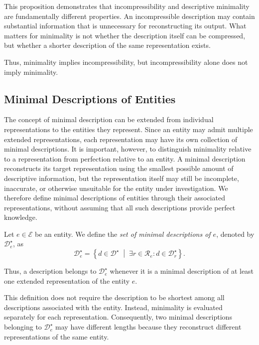 This proposition demonstrates that incompressibility and descriptive minimality are fundamentally different properties. An incompressible description may contain substantial information that is unnecessary for reconstructing its output. What matters for minimality is not whether the description itself can be compressed, but whether a shorter description of the same representation exists.

Thus, minimality implies incompressibility, but incompressibility alone does not imply minimality.


\subsection*{Minimal Descriptions of Entities}

The concept of minimal description can be extended from individual representations to the entities they represent. Since an entity may admit multiple extended representations, each representation may have its own collection of minimal descriptions. It is important, however, to distinguish minimality relative to a representation from perfection relative to an entity. A minimal description reconstructs its target representation using the smallest possible amount of descriptive information, but the representation itself may still be incomplete, inaccurate, or otherwise unsuitable for the entity under investigation. We therefore define minimal descriptions of entities through their associated representations, without assuming that all such descriptions provide perfect knowledge.

\begin{definition}
\label{def:entities_perfect_model}
Let $e\in\mathcal{E}$ be an entity. We define the \emph{set of minimal descriptions of $e$}, denoted by $\mathcal{D}_e^\star$, as
\[
\mathcal{D}_e^\star = \left\{d\in\mathcal{D}^\star \;\middle|\; \exists
r\in\mathcal{R}_e: d\in\mathcal{D}_r^\star \right\}.
\]
\end{definition}

Thus, a description belongs to $\mathcal{D}_e^\star$ whenever it is a minimal description of at least one extended representation of the entity $e$.

This definition does not require the description to be shortest among all descriptions associated with the entity. Instead, minimality is evaluated separately for each representation. Consequently, two minimal descriptions belonging to $\mathcal{D}_e^\star$ may have different lengths because they reconstruct different representations of the same entity.

